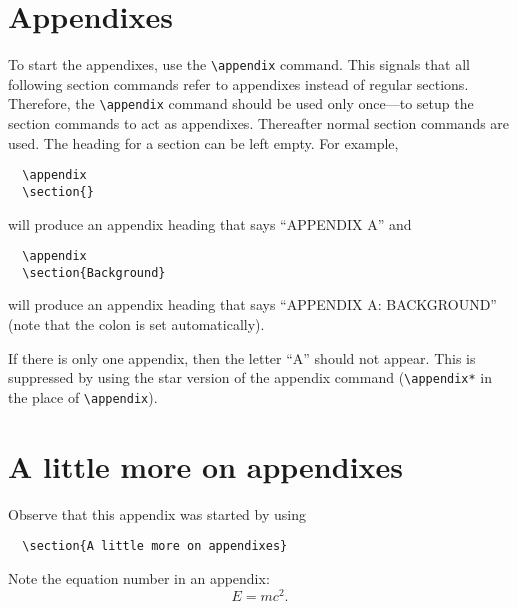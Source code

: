 \documentclass[%
 reprint,
 amsmath,amssymb,
 aps,
]{revtex4-2}
\begin{document}
  \appendix

  \section{Appendixes}

  To start the appendixes, use the \verb+\appendix+ command.
  This signals that all following section commands refer to appendixes
  instead of regular sections. Therefore, the \verb+\appendix+ command
  should be used only once---to setup the section commands to act as
  appendixes. Thereafter normal section commands are used. The heading
  for a section can be left empty. For example,
  \begin{verbatim}
  \appendix
  \section{}
  \end{verbatim}
  will produce an appendix heading that says ``APPENDIX A'' and
  \begin{verbatim}
  \appendix
  \section{Background}
  \end{verbatim}
  will produce an appendix heading that says ``APPENDIX A: BACKGROUND''
  (note that the colon is set automatically).

  If there is only one appendix, then the letter ``A'' should not
  appear. This is suppressed by using the star version of the appendix
  command (\verb+\appendix*+ in the place of \verb+\appendix+).

  \section{A little more on appendixes}

  Observe that this appendix was started by using
  \begin{verbatim}
  \section{A little more on appendixes}
  \end{verbatim}

  Note the equation number in an appendix:
  \begin{equation}
  E=mc^2.
  \end{equation}
\end{document}
